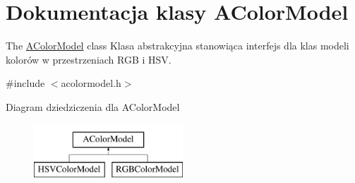 \hypertarget{class_a_color_model}{}\section{Dokumentacja klasy A\+Color\+Model}
\label{class_a_color_model}


The \mbox{\hyperlink{class_a_color_model}{A\+Color\+Model}} class Klasa abstrakcyjna stanowiąca interfejs dla klas modeli kolorów w przestrzeniach R\+GB i H\+SV.  




{\ttfamily \#include $<$acolormodel.\+h$>$}

Diagram dziedziczenia dla A\+Color\+Model\begin{figure}[H]
\begin{center}
\leavevmode
\includegraphics[height=2.000000cm]{class_a_color_model}
\end{center}
\end{figure}
